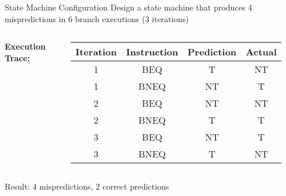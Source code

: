 \documentclass[aspectratio=169,12pt]{beamer}
\begin{document}
\begin{frame}{State Machine Configuration}
\textbf{} Design a state machine that produces 4 mispredictions in 6 branch executions (3 iterations)

\pause
\begin{center}
\end{center}
\begin{columns}
\textbf{Execution Trace:}
\begin{table}
\centering
\scriptsize
\begin{tabular}{|c|c|c|c|}
\hline
\textbf{Iteration} & \textbf{Instruction} & \textbf{Prediction} & \textbf{Actual} \\
\hline
1 & BEQ & T & NT \\
1 & BNEQ & NT & T \\
2 & BEQ & NT & NT \\
2 & BNEQ & T & T \\
3 & BEQ & NT & T \\
3 & BNEQ & T & NT \\
\hline
\end{tabular}
\end{table}
\end{columns}

Result: 4 mispredictions, 2 correct predictions
\end{frame}
\end{document}
